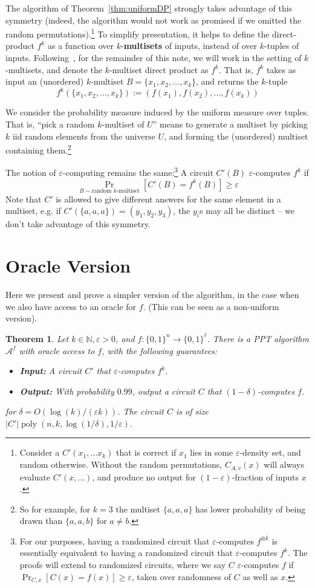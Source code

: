 \documentclass[]{article}
\newtheorem{theorem}{Theorem}
\newcommand{\1}{\mathbb{1}}
\newcommand{\N}{\mathbb{N}}
\renewcommand{\epsilon}{\varepsilon}
\newcommand{\eps}{\epsilon}
\DeclareMathOperator*{\poly}{poly}
\newcommand{\A}{\mathcal{A}}
\newcommand{\ox}{\otimes}
\begin{document}
The algorithm of Theorem~\ref{thm:uniformDP} strongly takes advantage of this symmetry (indeed,
the algorithm would not work as promised if we omitted the random
permutations).\footnote{Consider a $C'(x_1, \dots x_k)$ that is correct if $x_1$ lies in some
    $\eps$-density set, and random otherwise. Without the random permutations,
$C_{A, v}(x)$ will always evaluate $C'(x, \dots)$, and produce no output for
$(1-\epsilon)$-fraction of inputs $x$.}
To simplify presentation, it helps to define the direct-product
$f^k$ as a function over $k$-{\bf multisets} of inputs, instead of over
$k$-tuples of inputs.
Following~\cite{IJKW}, for the remainder of this note,
we will work in the setting of $k$-multisets,
and denote the $k$-multiset direct product as $f^k$.
That is, $f^k$ takes as input an (unordered) $k$-multiset
$B = \{x_1, x_2, \dots, x_k\}$, and returns the $k$-tuple
$$f^k(\{x_1, x_2, \dots, x_k\}) := (f(x_1), f(x_2), \dots, f(x_k))$$

We consider the probability measure induced by the uniform measure over tuples.
That is, ``pick a random $k$-multiset of $U$''
means to generate a multiset by picking
$k$ iid random elements from the universe $U$,
and forming the (unordered) multiset containing them.\footnote{So for example, for $k=3$ the multiset $\{a, a, a\}$
has lower probability of being drawn than $\{a, a, b\}$
for $a \neq b$.}

The notion of $\eps$-computing remains the same:\footnote{For our purposes,
    having a randomized circuit that
    $\eps$-computes $f^{\ox k}$ is essentially equivalent to having a
randomized circuit that $\eps$-computes $f^k$.
The proofs will extend to randomized circuits, where we say $C$
$\eps$-computes $f$ if $\Pr_{C, x}[C(x) = f(x)] \geq \eps$, taken over
randomness of $C$ as well as $x$.}
A circuit $C'(B)$ $\epsilon$-computes $f^k$
if
$$\Pr_{B \sim \text{random $k$-multiset}}[C'(B) = f^k(B)] \geq \epsilon$$
Note that $C'$ is allowed to give different answers for
the same element in a multiset, e.g. if $C'(\{a, a, a\}) = (y_1, y_2, y_3)$,
the $y_i$s may all be distinct -- we don't take advantage of this symmetry.

\section{Oracle Version}
Here we present and prove a simpler version of the algorithm, in the case when
we also have access to an oracle for $f$. (This can be seen as a non-uniform
version).
\begin{theorem}
\label{thm:oracle}
Let $k \in \N, \eps > 0$, and $f:\{0,1\}^n \to \{0, 1\}^\ell$.
There is a PPT algorithm $\A^f$ with oracle access to $f$, with the following guarantees:
\begin{itemize}
    \item {\bf Input:} A circuit $C'$ that $\eps$-computes $f^k$.
    \item {\bf Output:} With probability $0.99$, output a circuit $C$
        that $(1-\delta)$-computes $f$.
\end{itemize}
for $\delta = O(\log(k)/(\eps k))$.
The circuit $C$ is of size $|C'|\poly(n, k, \log(1/\delta), 1/\eps)$.
\end{theorem}
\end{document}
